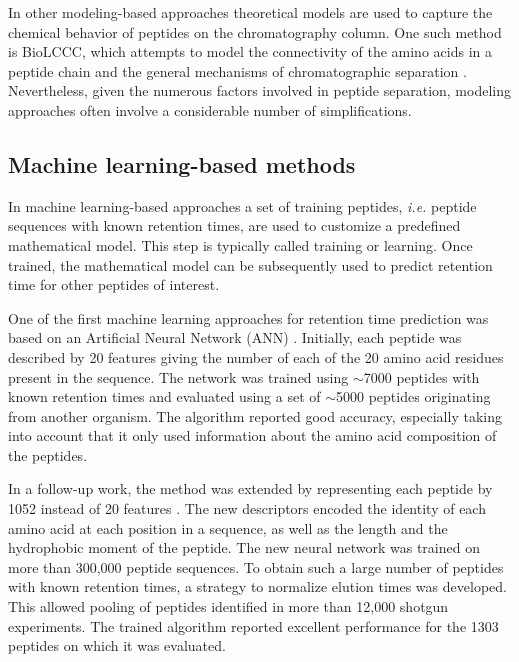 \documentclass[a4paper]{article}
\begin{document}
In other modeling-based approaches theoretical models are used to
capture the chemical behavior of peptides on the chromatography
column. One such method is BioLCCC, which attempts to model the
connectivity of the amino acids in a peptide chain and the general
mechanisms of chromatographic
separation \cite{gorshkov2006}. Nevertheless, given the numerous
factors involved in peptide separation, modeling approaches often
involve a considerable number of simplifications.
 
\subsection{Machine learning-based methods}
\label{sec:ML}

In machine learning-based approaches a set of training peptides,
{\em i.e.} peptide sequences with known retention times, are used to
customize a predefined mathematical model. This step is typically
called training or learning. Once trained, the mathematical model can
be subsequently used to predict retention time for other peptides of
interest.


One of the first machine learning approaches for retention time
prediction was based on an Artificial Neural Network
(ANN) \cite{petritis2003}. Initially, each peptide was described by 20
features giving the number of each of the 20 amino acid residues
present in the sequence. The network was trained using $\sim$7000
peptides with known retention times and evaluated using a set of
$\sim$5000 peptides originating from another organism. The algorithm
reported good accuracy, especially taking into account that it only
used information about the amino acid composition of the peptides.



In a follow-up work, the method was extended by representing each
peptide by 1052 instead of 20 features
\cite{petritis2006improved}. The new descriptors encoded the identity
of each amino acid at each position in a sequence, as well as the
length and the hydrophobic moment of the peptide. The new neural
network was trained on more than 300,000 peptide sequences. To obtain
such a large number of peptides with known retention times, a strategy
to normalize elution times was developed. This allowed pooling of
peptides identified in more than 12,000 shotgun experiments. The
trained algorithm reported excellent performance for the 1303 peptides
on which it was evaluated.
\end{document}
